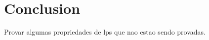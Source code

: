 \section{Conclusion}\label{seq:conclusion}

Provar algumas propriedades de lps que nao estao sendo provadas.


